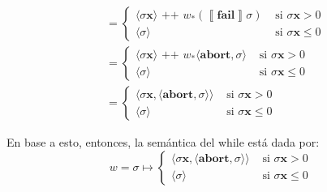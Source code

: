 \documentclass{article}
\newcommand{\sem}[1]{\left\llbracket #1\right\rrbracket}
\newcommand{\x}{\textbf{x}}
\newcommand{\concat}{\texttt{ ++ }}
\newcommand{\cfail}{\textbf{fail}}
\newcommand{\cabort}[1]{\langle\textbf{abort}, #1\rangle}
\newcommand{\cout}[1]{\langle #1\rangle}
\begin{document}
\begin{equation*}
  \begin{aligned}
    &= \begin{cases}
      \cout{\sigma\x} \concat w_* (\sem{\cfail}\sigma) &\text{ si }\sigma\x > 0 \\ 
      \cout{\sigma} &\text{ si }\sigma\x \leq 0
    \end{cases} \\ 
    &= \begin{cases}
      \cout{\sigma\x} \concat w_* \cabort{\sigma} &\text{ si }\sigma\x > 0 \\ 
      \cout{\sigma} &\text{ si }\sigma\x \leq 0
    \end{cases} \\ 
    &= \begin{cases}
      \cout{\sigma\x, \cabort{\sigma}} &\text{ si }\sigma\x > 0 \\ 
      \cout{\sigma} &\text{ si } \sigma\x \leq 0
    \end{cases}
  \end{aligned}
\end{equation*}

En base a esto, entonces, la semántica del while está dada por:
\begin{equation*}
  w = \sigma \mapsto \begin{cases}
    \cout{\sigma\x, \cabort{\sigma}} &\text{ si }\sigma\x > 0 \\ 
    \cout{\sigma} &\text{ si }\sigma\x \leq 0
  \end{cases}
\end{equation*}
\end{document}
